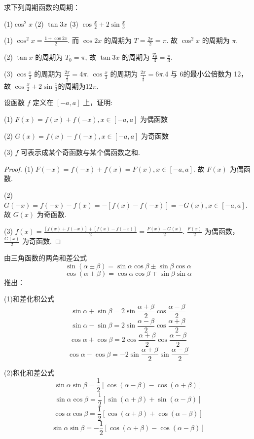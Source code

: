 \begin{practice}
    求下列周期函数的周期：

    (1)$\cos^2 x$ \qquad (2) $\tan 3x$ \qquad (3) $\cos \frac{x}{2} + 2\sin \frac{x}{3}$
\end{practice}

\begin{solve}
    (1) $\cos^2 x=\frac{1+\cos 2x}{2}$. 而 $\cos 2x$ 的周期为 $T=\frac{2\pi}{2}=\pi$. 故 $\cos^2 x$ 的周期为 $\pi$. 

    (2) $\tan x$ 的周期为 $T_0=\pi$, 故 $\tan 3x$ 的周期为 $\frac{T_0}{3}=\frac{\pi}{3}$.

    (3) $\cos \frac{x}{2}$ 的周期为 $\frac{2\pi}{\frac{1}{2}}=4\pi$. $\cos \frac{x}{3}$ 的周期为 $\frac{2\pi}{\frac{1}{3}}=6\pi$.4 与 6的最小公倍数为 12， 故 $\cos \frac{x}{2} + 2\sin \frac{x}{3}$的周期为$12\pi$.
\end{solve}

\begin{practice}
    设函数 $f$ 定义在 $[-a,a]$ 上，证明:

    (1) $F(x)=f(x)+f(-x),x\in [-a,a]$ 为偶函数

    (2) $G(x)=f(x)-f(-x),x\in [-a,a]$ 为奇函数

    (3) $f$ 可表示成某个奇函数与某个偶函数之和.
\end{practice}

\begin{proof}
    (1) $F(-x)=f(-x)+f(x)=F(x),x\in [-a,a]$. 故 $F(x)$ 为偶函数.

    (2) $G(-x)=f(-x)-f(x)=-[f(x)-f(-x)]=-G(x),x\in [-a,a]$. 故 $G(x)$ 为奇函数.

    (3) $f(x)=\frac{[f(x)+f(-x)]+[f(x)-f(-x)]}{2}=\frac{F(x)-G(x)}{2}$. $\frac{F(x)}{2}$ 为偶函数，$\frac{G(x)}{2}$ 为奇函数.
\end{proof}

\begin{practice}
    由三角函数的两角和差公式
    \[
    \sin (\alpha\pm \beta) = \sin \alpha \cos \beta \pm \sin \beta \cos \alpha
    \]
    \[
    \cos (\alpha\pm \beta) = \cos \alpha \cos \beta \mp \sin \beta \sin \alpha
    \]
    推出：
    
    (1)和差化积公式
    \[
    \sin \alpha + \sin \beta = 2\sin \frac{\alpha+\beta}{2} \cos \frac{\alpha-\beta}{2}
    \]
    \[
    \sin \alpha - \sin \beta = 2\sin \frac{\alpha-\beta}{2} \cos \frac{\alpha+\beta}{2}
    \]
    \[
    \cos \alpha + \cos \beta = 2\cos \frac{\alpha+\beta}{2} \cos \frac{\alpha-\beta}{2}
    \]
    \[
    \cos \alpha - \cos \beta = -2\sin \frac{\alpha+\beta}{2} \sin \frac{\alpha-\beta}{2}
    \]

    (2)积化和差公式
    \[
    \sin \alpha \sin \beta = \frac{1}{2}[\cos (\alpha-\beta)-\cos (\alpha+\beta)]
    \]
    \[
    \sin \alpha \cos \beta = \frac{1}{2}[\sin (\alpha+\beta)+\sin (\alpha-\beta)]
    \]
    \[
    \cos \alpha \cos \beta = \frac{1}{2}[\cos (\alpha+\beta)+\cos (\alpha-\beta)]
    \]
    \[
    \sin \alpha \sin \beta = -\frac{1}{2}[\cos (\alpha+\beta)-\cos (\alpha-\beta)]
    \]
\end{practice}

